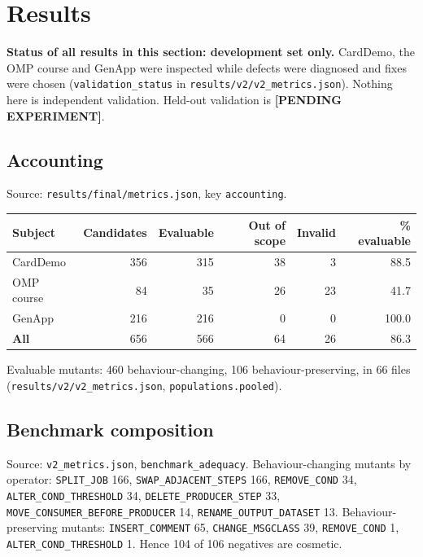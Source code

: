 \section{Results}
\label{sec:results}

\noindent\textbf{Status of all results in this section: development set only.}
CardDemo, the OMP course and GenApp were inspected while defects were diagnosed
and fixes were chosen (\texttt{validation\_status} in
\texttt{results/v2/v2\_metrics.json}). Nothing here is independent validation.
Held-out validation is \textbf{[PENDING EXPERIMENT]}.

\subsection{Accounting}
Source: \texttt{results/final/metrics.json}, key \texttt{accounting}.
\begin{center}
\begin{tabular}{@{}lrrrrr@{}}
\toprule
Subject & Candidates & Evaluable & Out of scope & Invalid & \% evaluable \\
\midrule
CardDemo & 356 & 315 & 38 & 3 & 88.5 \\
OMP course & 84 & 35 & 26 & 23 & 41.7 \\
GenApp & 216 & 216 & 0 & 0 & 100.0 \\
\textbf{All} & 656 & 566 & 64 & 26 & 86.3 \\
\bottomrule
\end{tabular}
\end{center}
Evaluable mutants: 460 behaviour-changing, 106 behaviour-preserving, in 66 files
(\texttt{results/v2/v2\_metrics.json}, \texttt{populations.pooled}).

\subsection{Benchmark composition}
Source: \texttt{v2\_metrics.json}, \texttt{benchmark\_adequacy}.
Behaviour-changing mutants by operator: \texttt{SPLIT\_JOB} 166,
\texttt{SWAP\_ADJACENT\_STEPS} 166, \texttt{REMOVE\_COND} 34,
\texttt{ALTER\_COND\_THRESHOLD} 34, \texttt{DELETE\_PRODUCER\_STEP} 33,
\texttt{MOVE\_CONSUMER\_BEFORE\_PRODUCER} 14, \texttt{RENAME\_OUTPUT\_DATASET} 13.
Behaviour-preserving mutants: \texttt{INSERT\_COMMENT} 65,
\texttt{CHANGE\_MSGCLASS} 39, \texttt{REMOVE\_COND} 1,
\texttt{ALTER\_COND\_THRESHOLD} 1. Hence 104 of 106 negatives are cosmetic.

